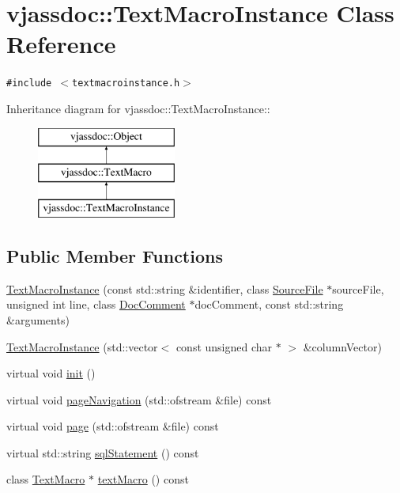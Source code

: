 \hypertarget{classvjassdoc_1_1TextMacroInstance}{
\section{vjassdoc::TextMacroInstance Class Reference}
\label{classvjassdoc_1_1TextMacroInstance}
}
{\tt \#include $<$textmacroinstance.h$>$}

Inheritance diagram for vjassdoc::TextMacroInstance::\begin{figure}[H]
\begin{center}
\leavevmode
\includegraphics[height=3cm]{classvjassdoc_1_1TextMacroInstance}
\end{center}
\end{figure}
\subsection*{Public Member Functions}
\begin{CompactItemize}
\item 
\hyperlink{classvjassdoc_1_1TextMacroInstance_e6f4e775e305ef77a1952b6ff909193d}{TextMacroInstance} (const std::string \&identifier, class \hyperlink{classvjassdoc_1_1SourceFile}{SourceFile} $\ast$sourceFile, unsigned int line, class \hyperlink{classvjassdoc_1_1DocComment}{DocComment} $\ast$docComment, const std::string \&arguments)
\item 
\hyperlink{classvjassdoc_1_1TextMacroInstance_7bd68ef5afcd884b1802e5b4dbaf829d}{TextMacroInstance} (std::vector$<$ const unsigned char $\ast$ $>$ \&columnVector)
\item 
virtual void \hyperlink{classvjassdoc_1_1TextMacroInstance_e60b03ce172f8eefde2cdcc31533ee2d}{init} ()
\item 
virtual void \hyperlink{classvjassdoc_1_1TextMacroInstance_2bc8e5c94f5a74795d0c2d8137522d89}{pageNavigation} (std::ofstream \&file) const 
\item 
virtual void \hyperlink{classvjassdoc_1_1TextMacroInstance_4785937fa62c12f3586276a2d5dcbe52}{page} (std::ofstream \&file) const 
\item 
virtual std::string \hyperlink{classvjassdoc_1_1TextMacroInstance_7659e7ac5ff7547dfc526a4a7ff152b5}{sqlStatement} () const 
\item 
class \hyperlink{classvjassdoc_1_1TextMacro}{TextMacro} $\ast$ \hyperlink{classvjassdoc_1_1TextMacroInstance_2ad0f2fc0c5d03502e91899f6621edfc}{textMacro} () const 
\end{CompactItemize}


